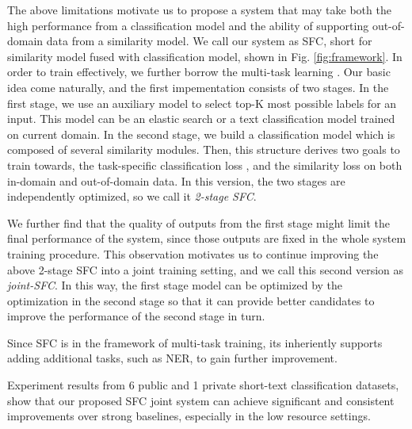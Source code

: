 The  above  limitations motivate us to propose a system that may take both the high performance from a classification model and the ability of supporting out-of-domain data from a similarity model.
We call our system as SFC,  short  for  similarity model fused with classification model, shown in Fig.  \ref{fig:framework}.  
In order to train effectively, we further borrow the multi-task learning   \cite{caruana1993multitask,collobert2008unified,  liu2019multi}.
Our basic  idea  come naturally, and the first impementation consists of two stages. 
In the first stage, we use an auxiliary model to  select  top-K most possible labels for an input. 
This model can be an elastic search  \cite{divya2013elasticsearch}  or a text classification model trained on current domain.  
In  the  second  stage,  we  build  a classification  model  which is composed of several similarity  modules. 
Then, this structure  derives  two  goals to train towards, the task-specific classification loss ,  and  the similarity loss on both in-domain and out-of-domain data. 
In this version, the two stages are  independently optimized, so we call it \emph{2-stage SFC}. 

We further find that the  quality of outputs from the first stage might limit the final performance of the system,  since  those outputs are fixed in the whole system training  procedure.  
This  observation motivates us to continue improving  the  above 2-stage  SFC  into a joint training setting, and we call this second version as \emph{joint-SFC}. 
In this  way, the first stage model can be optimized by the optimization in the second stage so that it can provide better candidates to improve the performance of the second stage in turn.

Since SFC is in the framework of multi-task training, its inheriently supports adding additional tasks, such as NER, to gain further improvement.

Experiment  results  from  6  public  and  1  private  short-text classification datasets,  show  that  our proposed SFC joint system can achieve significant and consistent  improvements  over  strong baselines, especially in the low resource settings.

